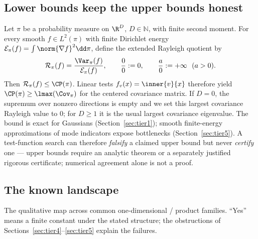 \documentclass[../main.tex]{subfiles}
\begin{document}
\subsection{Lower bounds keep the upper bounds honest}
\label{subsec:lower-bounds}

\begin{remark}
\label{rem:rayleigh-lower-only}
Let $\pi$ be a probability measure on $\R^D$, $D\in\mathbb N$, with finite second moment. For every
smooth $f\in L^2(\pi)$ with finite Dirichlet energy
$\mathcal E_\pi(f)=\int\norm{\nabla f}^2\dd\pi$, define the extended Rayleigh quotient by
\[
  \mathcal R_\pi(f)=\frac{\Var_\pi(f)}{\mathcal E_\pi(f)},
  \qquad \frac00:=0,\qquad \frac a0:=+\infty\ \ (a>0).
\]
Then $\mathcal R_\pi(f)\le\CP(\pi)$. Linear tests $f_v(x)=\inner{v}{x}$ therefore yield
$\CP(\pi)\ge\lmax(\Cov_\pi)$ for the centered covariance matrix. If $D=0$, the supremum over
nonzero directions is empty and we set this largest covariance Rayleigh value to $0$; for
$D\ge1$ it is the usual largest covariance eigenvalue. The bound is exact for Gaussians
(Section~\ref{sec:tier1}); smooth finite-energy approximations of mode indicators expose
bottlenecks (Section~\ref{sec:tier5}).
A test-function search can therefore \emph{falsify} a claimed upper bound but never
\emph{certify} one --- upper bounds require an analytic theorem or a separately justified rigorous
certificate; numerical agreement alone is not a proof.
\end{remark}

\subsection{The known landscape}
\label{subsec:landscape}

The qualitative map across common one-dimensional / product families. ``Yes'' means a finite
constant under the stated structure; the obstructions of Sections~\ref{sec:tier4}--\ref{sec:tier5}
explain the failures.
\end{document}
